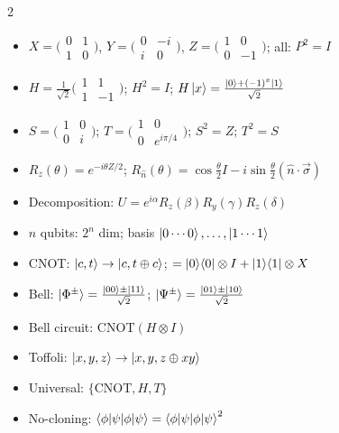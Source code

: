 \documentclass[10pt,a4paper]{article}
\begin{document}
\begin{multicols}{2}
\begin{tcolorbox}[cheatstyle, title={Single-Qubit Gates}]
\begin{itemize}[nosep,leftmargin=*]
\item $X{=}\bigl(\begin{smallmatrix}0&1\\1&0\end{smallmatrix}\bigr)$, $Y{=}\bigl(\begin{smallmatrix}0&-i\\i&0\end{smallmatrix}\bigr)$, $Z{=}\bigl(\begin{smallmatrix}1&0\\0&-1\end{smallmatrix}\bigr)$; all: $P^2=I$
\item $H{=}\frac{1}{\sqrt{2}}\bigl(\begin{smallmatrix}1&1\\1&-1\end{smallmatrix}\bigr)$; $H^2=I$; $H\ket{x}=\frac{\ket{0}+(-1)^x\ket{1}}{\sqrt{2}}$
\item $S{=}\bigl(\begin{smallmatrix}1&0\\0&i\end{smallmatrix}\bigr)$; $T{=}\bigl(\begin{smallmatrix}1&0\\0&e^{i\pi/4}\end{smallmatrix}\bigr)$; $S^2=Z$; $T^2=S$
\item $R_z(\theta)=e^{-i\theta Z/2}$; $R_{\hat{n}}(\theta)=\cos\frac{\theta}{2}I-i\sin\frac{\theta}{2}(\hat{n}\cdot\vec\sigma)$
\item Decomposition: $U=e^{i\alpha}R_z(\beta)R_y(\gamma)R_z(\delta)$
\end{itemize}
\end{tcolorbox}

\begin{tcolorbox}[cheatstyle, title={Multi-Qubit \& Entanglement}]
\begin{itemize}[nosep,leftmargin=*]
\item $n$ qubits: $2^n$ dim; basis $\ket{0\cdots0},\ldots,\ket{1\cdots1}$
\item CNOT: $\ket{c,t}\to\ket{c,t\oplus c}$; $=\ket{0}\!\bra{0}\otimes I+\ket{1}\!\bra{1}\otimes X$
\item Bell: $\ket{\Phi^\pm}=\frac{\ket{00}\pm\ket{11}}{\sqrt{2}}$; $\ket{\Psi^\pm}=\frac{\ket{01}\pm\ket{10}}{\sqrt{2}}$
\item Bell circuit: $\mathrm{CNOT}(H\otimes I)$
\item Toffoli: $\ket{x,y,z}\to\ket{x,y,z\oplus xy}$
\item Universal: $\{\mathrm{CNOT},H,T\}$
\item No-cloning: $\braket{\phi|\psi}=\braket{\phi|\psi}^2$
\end{itemize}
\end{tcolorbox}


\end{multicols}
\end{document}
